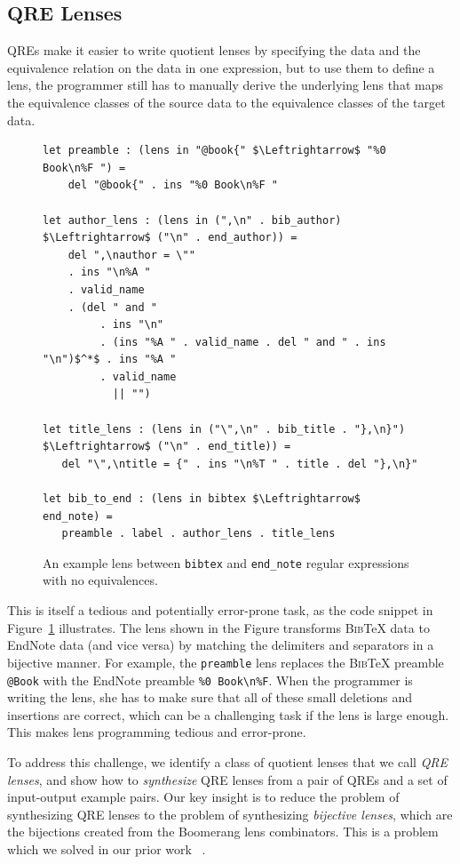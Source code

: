 \documentclass{svproc}
\newcommand{\cd}[1]{\lstinline[backgroundcolor=\color{white}]$#1$}
\newcommand{\bibtex}{\textsc{Bib}\TeX{}}
\begin{document}
\subsection{QRE Lenses}
QREs make it easier to write quotient lenses by specifying the data and the
equivalence relation on the data in one expression, but to use them to define a
lens, the programmer still has to manually derive the underlying lens that maps
the equivalence classes of the source data to the equivalence classes of the
target data. 

\begin{figure}[t]
\begin{lstlisting}
let preamble : (lens in "@book{" $\Leftrightarrow$ "%0 Book\n%F ") = 
    del "@book{" . ins "%0 Book\n%F "
  
let author_lens : (lens in (",\n" . bib_author) $\Leftrightarrow$ ("\n" . end_author)) = 
    del ",\nauthor = \""
    . ins "\n%A "
    . valid_name
    . (del " and "
         . ins "\n"
         . (ins "%A " . valid_name . del " and " . ins "\n")$^*$ . ins "%A "
         . valid_name
           || "")
           
let title_lens : (lens in ("\",\n" . bib_title . "},\n}") $\Leftrightarrow$ ("\n" . end_title)) =
   del "\",\ntitle = {" . ins "\n%T " . title . del "},\n}" 
    
let bib_to_end : (lens in bibtex $\Leftrightarrow$ end_note) =
   preamble . label . author_lens . title_lens
\end{lstlisting}
\caption{An example lens between \cd{bibtex} and \cd{end_note} regular
expressions with no equivalences.}
\label{fig:example-lens}
\end{figure}

This is itself a tedious and potentially error-prone task, as the code snippet
in Figure~\ref{fig:example-lens} illustrates.  The lens shown in the Figure
transforms \bibtex{} data to EndNote data  (and vice versa) by matching
the delimiters and separators in a bijective manner. For example, the
\cd{preamble} lens replaces the \bibtex{} preamble \verb|@Book| with the EndNote
preamble \verb|%0 Book\n%F|. When the programmer is writing the lens, she has
to make sure that all of these small deletions and insertions are correct,
which can be a challenging task if the lens is large enough. This makes lens
programming tedious and error-prone.

To address this challenge, we identify a  class of quotient lenses that we call
{\em QRE lenses}, and show how to {\em synthesize} QRE lenses from a pair of
QREs and a set of input-output example pairs. Our key insight is to reduce the
problem of synthesizing QRE lenses to the problem of synthesizing {\em
bijective lenses}, which are the bijections created from the Boomerang lens
combinators. This is a problem which we solved in our prior work ~\cite{popl18}.
\end{document}

